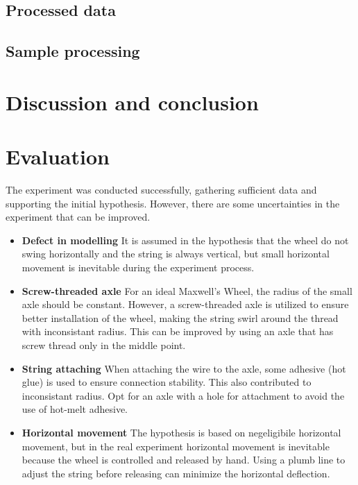 \documentclass[a4paper]{article}
\begin{document}
\subsection{Processed data}



\subsection{Sample processing}

\section{Discussion and conclusion}

\section{Evaluation}

The experiment was conducted successfully, gathering sufficient data and supporting the initial hypothesis. However, there are some uncertainties in the experiment that can be improved. 

\begin{itemize}
    \item \textbf{Defect in modelling} It is assumed in the hypothesis that the wheel do not swing horizontally and the string is always vertical, but small horizontal movement is inevitable during the experiment process.
    \item \textbf{Screw-threaded axle} For an ideal Maxwell's Wheel, the radius of the small axle should be constant. However, a screw-threaded axle is utilized to ensure better installation of the wheel, making the string swirl around the thread with inconsistant radius. This can be improved by using an axle that has screw thread only in the middle point. 
    \item \textbf{String attaching} When attaching the wire to the axle, some adhesive (hot glue) is used to ensure connection stability. This also contributed to inconsistant radius. Opt for an axle with a hole for attachment to avoid the use of hot-melt adhesive. 
    \item \textbf{Horizontal movement} The hypothesis is based on negeligibile horizontal movement, but in the real experiment horizontal movement is inevitable because the wheel is controlled and released by hand. Using a plumb line to adjust the string before releasing can minimize the horizontal deflection.
\end{itemize}



\end{document}
